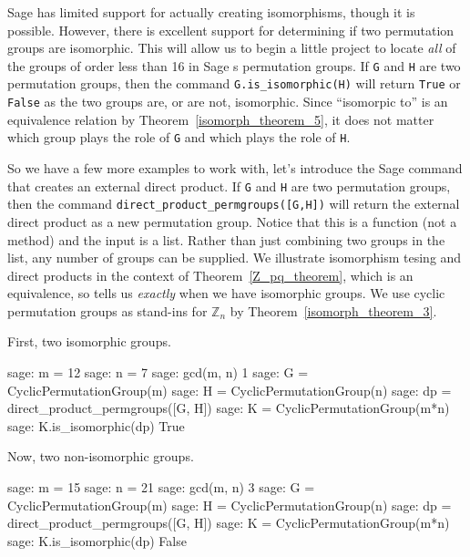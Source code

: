 Sage has limited support for actually creating isomorphisms, though it is possible.  However, there is excellent support for determining if two permutation groups are isomorphic.  This will allow us to begin a little project to locate \emph{all} of the groups of order less than 16 in Sage s permutation groups.
%
%
If \verb?G? and \verb?H? are two permutation groups, then the command \verb?G.is_isomorphic(H)? will return \verb?True? or \verb?False? as the two groups are, or are not, isomorphic.  Since ``isomorpic to'' is an equivalence relation by Theorem~\ref{isomorph_theorem_5}, it does not matter which group plays the role of \verb?G? and which plays the role of \verb?H?.\par
%
So we have a few more examples to work with, let's introduce the Sage command that creates an external direct product.  If \verb?G? and \verb?H? are two permutation groups, then the command \verb?direct_product_permgroups([G,H])? will  return the external direct product as a new permutation group.  Notice that this is a function (not a method) and the input is a list.  Rather than just combining two groups in the list, any number of groups can be supplied.  We illustrate isomorphism tesing and direct products in the context of Theorem~\ref{Z_pq_theorem}, which is an equivalence, so tells us \emph{exactly} when we have isomorphic groups.  We use cyclic permutation groups as stand-ins for ${\mathbb Z}_n$ by Theorem~\ref{isomorph_theorem_3}.\par
%
First, two isomorphic groups.
%
\begin{sageexample}
sage: m = 12
sage: n = 7
sage: gcd(m, n)
1
sage: G = CyclicPermutationGroup(m)
sage: H = CyclicPermutationGroup(n)
sage: dp = direct_product_permgroups([G, H])
sage: K = CyclicPermutationGroup(m*n)
sage: K.is_isomorphic(dp)
True
\end{sageexample}
%
Now, two non-isomorphic groups.
%
\begin{sageexample}
sage: m = 15
sage: n = 21
sage: gcd(m, n)
3
sage: G = CyclicPermutationGroup(m)
sage: H = CyclicPermutationGroup(n)
sage: dp = direct_product_permgroups([G, H])
sage: K = CyclicPermutationGroup(m*n)
sage: K.is_isomorphic(dp)
False
\end{sageexample}

